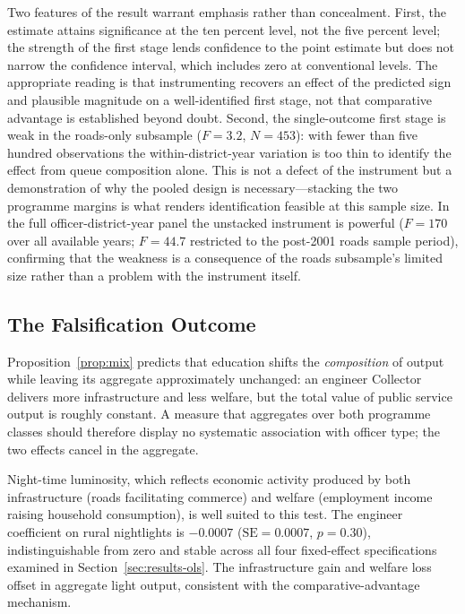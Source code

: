 Two features of the result warrant emphasis rather than concealment. First, the
estimate attains significance at the ten percent level, not the five percent level;
the strength of the first stage lends confidence to the point estimate but does not
narrow the confidence interval, which includes zero at conventional levels. The
appropriate reading is that instrumenting recovers an effect of the predicted sign and
plausible magnitude on a well-identified first stage, not that comparative advantage
is established beyond doubt. Second, the single-outcome first stage is weak in the
roads-only subsample ($F=3.2$, $N=453$): with fewer than five hundred observations
the within-district-year variation is too thin to identify the effect from queue
composition alone. This is not a defect of the instrument but a demonstration of why
the pooled design is necessary---stacking the two programme margins is what renders
identification feasible at this sample size. In the full officer-district-year panel the
unstacked instrument is powerful ($F=170$ over all available years; $F=44.7$ restricted
to the post-2001 roads sample period), confirming that the weakness is a consequence of
the roads subsample's limited size rather than a problem with the instrument itself.

\subsection{The Falsification Outcome}
\label{sec:results-falsification}

Proposition~\ref{prop:mix} predicts that education shifts the \emph{composition} of
output while leaving its aggregate approximately unchanged: an engineer Collector
delivers more infrastructure and less welfare, but the total value of public service
output is roughly constant. A measure that aggregates over both programme classes
should therefore display no systematic association with officer type; the two effects
cancel in the aggregate.

Night-time luminosity, which reflects economic activity produced by both infrastructure
(roads facilitating commerce) and welfare (employment income raising household
consumption), is well suited to this test. The engineer coefficient on rural nightlights
is $-0.0007$ ($\text{SE}=0.0007$, $p=0.30$), indistinguishable from zero and stable
across all four fixed-effect specifications examined in Section~\ref{sec:results-ols}.
The infrastructure gain and welfare loss offset in aggregate light output, consistent
with the comparative-advantage mechanism.

